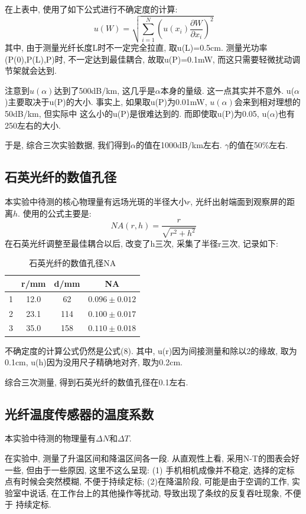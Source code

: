 \documentclass[12pt,a4paper]{article}
\begin{document}
在上表中, 使用了如下公式进行不确定度的计算: 
\begin{equation}
    u(W)=\sqrt{\sum_{i=1}^N (u(x_{i})\frac{\partial W}{\partial x_{i}})^2}
\end{equation}
其中, 由于测量光纤长度L时不一定完全拉直, 取u(L)=0.5cm. 测量光功率(P(0),P(L),P)时, 不一定达到最佳耦合, 故取u(P)=0.1mW, 
而这只需要轻微扰动调节架就会达到. 

注意到$u(\alpha)$达到了500dB/km, 这几乎是$\alpha$本身的量级. 这一点其实并不意外. u($\alpha$)主要取决于u(P)的大小. 事实上, 如果取u(P)为0.01mW, $u(\alpha)$会来到相对理想的50dB/km, 但实际中
这么小的u(P)是很难达到的. 而即使取u(P)为0.05, u($\alpha$)也有250左右的大小.

于是, 综合三次实验数据, 我们得到$\alpha$的值在1000dB/km左右. $\gamma$的值在50\%左右.

\subsection{石英光纤的数值孔径}
本实验中待测的核心物理量有远场光斑的半径大小$r$, 光纤出射端面到观察屏的距离$h$. 
使用的公式主要是:
\begin{equation}
    {NA}(r,h)=\frac{r}{\sqrt{r^2+h^2}}
\end{equation}
在石英光纤调整至最佳耦合以后, 改变了h三次, 采集了半径r三次, 记录如下:
\begin{table}[H]
    \centering
    \begin{tabular}{|c|c|c|c|} 
    \hline
      & r/mm & d/mm & NA           \\ 
    \hline
    1 & 12.0  & 62  & $0.096\pm 0.012$  \\ 
    \hline
    2 & 23.1 & 114  & $0.100\pm 0.017$  \\ 
    \hline
    3 & 35.0   & 158 & $0.110\pm 0.018$  \\
    \hline
    \end{tabular}
    \caption{石英光纤的数值孔径NA}
    \end{table}
不确定度的计算公式仍然是公式(8). 其中, u(r)因为间接测量和除以2的缘故, 取为0.1cm, u(h)因为没用尺子精确地对齐, 取为0.2cm. 

综合三次测量, 得到石英光纤的数值孔径在0.1左右.

\subsection{光纤温度传感器的温度系数}
本实验中待测的物理量有$\Delta N$和$\Delta T$. 

在实验中, 测量了升温区间和降温区间各一段. 从直观性上看, 采用N-T的图表会好一些, 但由于一些原因, 这里不这么呈现: (1)
手机相机成像并不稳定, 选择的定标点有时候会突然模糊, 不便于持续定标; (2)在降温阶段, 可能是由于空调的工作, 实验室中说话, 在工作台上的其他操作等扰动, 导致出现了条纹的反复吞吐现象, 不便于
持续定标. 
\end{document}
